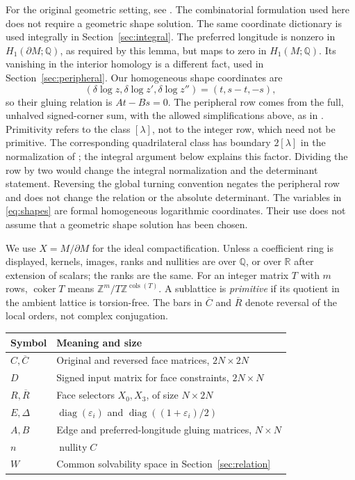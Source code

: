 \documentclass[11pt]{article}
\theoremstyle{definition}\newtheorem{definition}[theorem]{Definition}
\theoremstyle{remark}\newtheorem{remark}[theorem]{Remark}
\DeclareMathOperator{\nullity}{nullity}
\DeclareMathOperator{\coker}{coker}
\DeclareMathOperator{\diag}{diag}
\newcommand{\R}{\mathbb R}
\newcommand{\Z}{\mathbb Z}
\newcommand{\Q}{\mathbb Q}
\newcommand{\Ct}{\overline C}
\newcommand{\Rt}{\overline R}
\newcommand{\eps}{\varepsilon}
\begin{document}
For the original geometric setting, see \cite[Theorem 2.2 and
Propositions 2.3 and 2.5]{NZ}. The combinatorial formulation used here
does not require a geometric shape solution. The same coordinate
dictionary is used integrally in Section~\ref{sec:integral}.
The preferred longitude is nonzero in $H_1(\partial M;\Q)$, as required
by this lemma, but maps to zero in $H_1(M;\Q)$. Its vanishing in the
interior homology is a different fact, used in
Section~\ref{sec:peripheral}.
Our homogeneous shape coordinates are
\begin{equation}(\delta\log z,\delta\log z',\delta\log z'')=(t,s-t,-s),\label{eq:shapes}\end{equation}
so their gluing relation is $At-Bs=0$.
The peripheral row comes from the full, unhalved signed-corner sum,
with the allowed simplifications above, as in \cite{BGW,Wong}.
Primitivity refers to the class $[\lambda]$, not to
the integer row, which need not be primitive. The corresponding
quadrilateral class has boundary $2[\lambda]$ in the normalization
of \cite[Section 7.1]{GHHHR}; the integral argument below explains
this factor. Dividing the row by two would change the integral
normalization and the determinant statement. Reversing the global
turning convention negates the peripheral row and does not change
the relation or the absolute determinant. The variables in
\eqref{eq:shapes} are formal homogeneous logarithmic coordinates.
Their use does not assume that a geometric shape solution has been chosen.

We use $X=M/\partial M$ for the ideal compactification. Unless a coefficient ring is displayed, kernels, images, ranks and nullities are over $\Q$, or over $\R$ after extension of scalars; the ranks are the same. For an integer matrix $T$ with $m$ rows, $\coker T$ means $\Z^m/T\Z^{\operatorname{cols}(T)}$. A sublattice is \emph{primitive} if its quotient in the ambient lattice is torsion-free. The bars in $\Ct$ and $\Rt$ denote reversal of the local orders, not complex conjugation.

\begin{center}
\begin{tabular}{ll}
\hline
Symbol & Meaning and size\\
\hline
$C,\Ct$ & Original and reversed face matrices, $2N\times2N$\\
$D$ & Signed input matrix for face constraints, $2N\times N$\\
$R,\Rt$ & Face selectors $X_0,X_3$, of size $N\times2N$\\
$E,\Delta$ & $\diag(\eps_i)$ and $\diag((1+\eps_i)/2)$\\
$A,B$ & Edge and preferred-longitude gluing matrices, $N\times N$\\
$n$ & $\nullity C$\\
$W$ & Common solvability space in Section~\ref{sec:relation}\\
\hline
\end{tabular}
\end{center}
\end{document}

